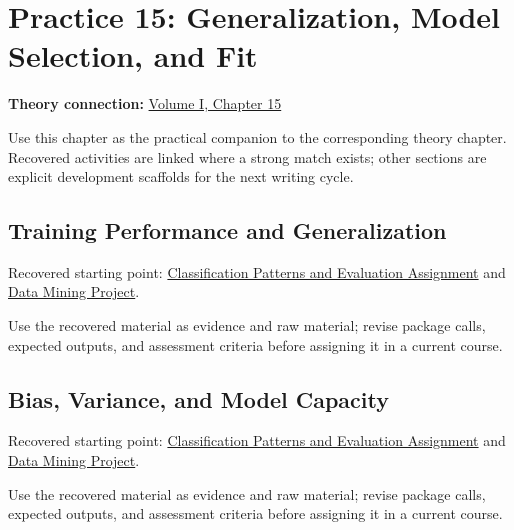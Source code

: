 \documentclass[
  letterpaper,
]{scrbook}
\begin{document}
\chapter*{Practice 15: Generalization, Model Selection, and
Fit}\label{ch-practice-15}


\textbf{Theory connection:} \hyperref[ch-generalization]{Volume I,
Chapter 15}

Use this chapter as the practical companion to the corresponding theory
chapter. Recovered activities are linked where a strong match exists;
other sections are explicit development scaffolds for the next writing
cycle.

\section*{Training Performance and
Generalization}\label{sec-pr-15-training-performance-and-generalization}


Recovered starting point:
\hyperref[sec-lab-classification-patterns-assignment]{Classification
Patterns and Evaluation Assignment} and
\hyperref[sec-lab-data-mining-project]{Data Mining Project}.

Use the recovered material as evidence and raw material; revise package
calls, expected outputs, and assessment criteria before assigning it in
a current course.

\section*{Bias, Variance, and Model
Capacity}\label{sec-pr-15-bias-variance-and-model-capacity}


Recovered starting point:
\hyperref[sec-lab-classification-patterns-assignment]{Classification
Patterns and Evaluation Assignment} and
\hyperref[sec-lab-data-mining-project]{Data Mining Project}.

Use the recovered material as evidence and raw material; revise package
calls, expected outputs, and assessment criteria before assigning it in
a current course.
\end{document}
